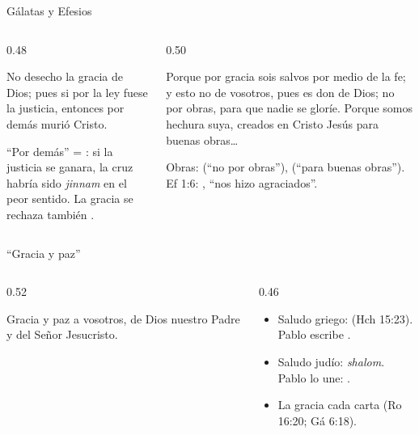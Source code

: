 \begin{frame}{Gálatas y Efesios}
\begin{columns}[t,onlytextwidth]
\begin{column}{0.48\textwidth}
\begin{cita}No desecho la gracia de Dios; pues si por la ley fuese la justicia, entonces por demás murió Cristo.\end{cita}
\scriptsize ``Por demás'' = : si la justicia se ganara, la cruz habría sido \emph{jinnam} en el peor sentido. La gracia se rechaza también .
\end{column}
\begin{column}{0.50\textwidth}
\begin{cita}Porque por gracia sois salvos por medio de la fe; y esto no de vosotros, pues es don de Dios; no por obras, para que nadie se gloríe. Porque somos hechura suya, creados en Cristo Jesús para buenas obras\ldots{}\end{cita}
\scriptsize Obras:  (``no por obras''),  (``para buenas obras''). Ef 1:6: , ``nos hizo agraciados''.\par
{}
\end{column}
\end{columns}
\end{frame}

\begin{frame}{``Gracia y paz''}
\begin{columns}[c,onlytextwidth]
\begin{column}{0.52\textwidth}
\centering{}
\begin{cita}Gracia y paz a vosotros, de Dios nuestro Padre y del Señor Jesucristo.\end{cita}
\end{column}
\begin{column}{0.46\textwidth}\small\RaggedRight
\begin{itemize}
\item Saludo griego:  (Hch 15:23). Pablo escribe .
\item Saludo judío: \emph{shalom}. Pablo lo une: .
\item La gracia  cada carta (Ro 16:20; Gá 6:18).
\end{itemize}
\end{column}
\end{columns}
\end{frame}

